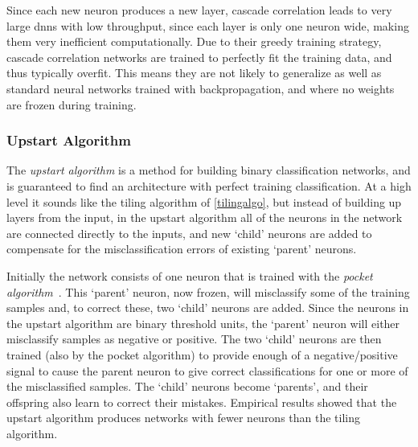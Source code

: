 \documentclass[thesis]{subfiles}
\begin{document}
	Since each new neuron produces a new layer, cascade correlation leads to very large \glspl{dnn} with low throughput, since each layer is only one neuron wide, making them very inefficient computationally. Due to their greedy training strategy, cascade correlation networks are trained to perfectly fit the training data, and thus typically overfit. This means they are not likely to generalize as well as standard neural networks trained with backpropagation, and where no weights are frozen during training.

	\subsubsection{Upstart Algorithm}
	The \emph{upstart algorithm} is a method for building binary classification networks, and is guaranteed to find an architecture with perfect training classification. At a high level it sounds like the tiling algorithm of \cref{tilingalgo}, but instead of building up layers from the input, in the upstart algorithm all of the neurons in the network are connected directly to the inputs, and new `child' neurons are added to compensate for the misclassification errors of existing `parent' neurons.
	
	Initially the network consists of one neuron that is trained with the \emph{pocket algorithm}~\citep{gallant1986optimal}. This `parent' neuron, now frozen, will misclassify some of the training samples and, to correct these, two `child' neurons are added. Since the neurons in the upstart algorithm are binary threshold units, the `parent' neuron will either misclassify samples as negative or positive. The two `child' neurons are then trained (also by the pocket algorithm) to provide enough of a negative/positive signal to cause the parent neuron to give correct classifications for one or more of the misclassified samples. The `child' neurons become `parents', and their offspring also learn to correct their mistakes. Empirical results showed that the upstart algorithm produces networks with fewer neurons than the tiling algorithm.
	
	
\end{document}
